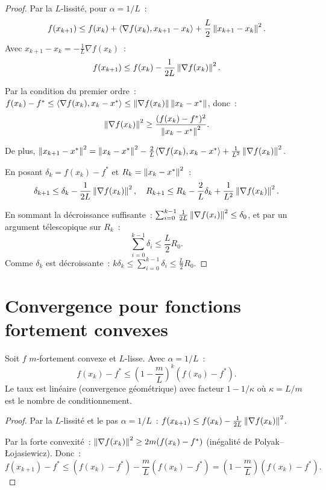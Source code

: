 \begin{proof}
Par la $L$-lissit\'e, pour $\alpha = 1/L$~:
\[
    f(x_{k+1}) \leq f(x_k) + \langle \nabla f(x_k), x_{k+1} - x_k \rangle + \frac{L}{2}\left\| x_{k+1} - x_k \right\|^2.
\]
Avec $x_{k+1} - x_k = -\frac{1}{L}\nabla f(x_k)$~:
\[
    f(x_{k+1}) \leq f(x_k) - \frac{1}{2L}\left\| \nabla f(x_k) \right\|^2.
\]

Par la condition du premier ordre~: $f(x_k) - f^* \leq \langle \nabla f(x_k), x_k - x^* \rangle
\leq \left\| \nabla f(x_k) \right\|\left\| x_k - x^* \right\|$, donc~:
\[
    \left\| \nabla f(x_k) \right\|^2 \geq \frac{(f(x_k) - f^*)^2}{\left\| x_k - x^* \right\|^2}.
\]

De plus, $\left\| x_{k+1} - x^* \right\|^2 = \left\| x_k - x^* \right\|^2 - \frac{2}{L}\langle \nabla f(x_k), x_k - x^* \rangle + \frac{1}{L^2}\left\| \nabla f(x_k) \right\|^2$.

En posant $\delta_k = f(x_k) - f^*$ et $R_k = \left\| x_k - x^* \right\|^2$~:
\[
    \delta_{k+1} \leq \delta_k - \frac{1}{2L}\left\| \nabla f(x_k) \right\|^2, \quad
    R_{k+1} \leq R_k - \frac{2}{L}\delta_k + \frac{1}{L^2}\left\| \nabla f(x_k) \right\|^2.
\]

En sommant la d\'ecroissance suffisante~:
$\sum_{i=0}^{k-1} \frac{1}{2L}\left\| \nabla f(x_i) \right\|^2 \leq \delta_0$, et par
un argument t\'elescopique sur $R_k$~:
\[
    \sum_{i=0}^{k-1} \delta_i \leq \frac{L}{2}R_0.
\]
Comme $\delta_k$ est d\'ecroissante~: $k\delta_k \leq \sum_{i=0}^{k-1}\delta_i \leq \frac{L}{2}R_0$.
\end{proof}

\section{Convergence pour fonctions fortement convexes}

\begin{theoreme}
\label{thm:conv_forte}
Soit $f$ $m$-fortement convexe et $L$-lisse. Avec $\alpha = 1/L$~:
\[
    f(x_k) - f^* \leq \left(1 - \frac{m}{L}\right)^k (f(x_0) - f^*).
\]
Le taux est lin\'eaire (convergence g\'eom\'etrique) avec facteur $1 - 1/\kappa$
o\`u $\kappa = L/m$ est le nombre de conditionnement.
\end{theoreme}

\begin{proof}
Par la $L$-lissit\'e et le pas $\alpha = 1/L$~:
$f(x_{k+1}) \leq f(x_k) - \frac{1}{2L}\left\| \nabla f(x_k) \right\|^2$.

Par la forte convexit\'e~: $\left\| \nabla f(x_k) \right\|^2 \geq 2m(f(x_k) - f^*)$
(in\'egalit\'e de Polyak--\L{}ojasiewicz). Donc~:
\[
    f(x_{k+1}) - f^* \leq (f(x_k) - f^*) - \frac{m}{L}(f(x_k) - f^*)
    = \left(1 - \frac{m}{L}\right)(f(x_k) - f^*).
\]
\end{proof}

